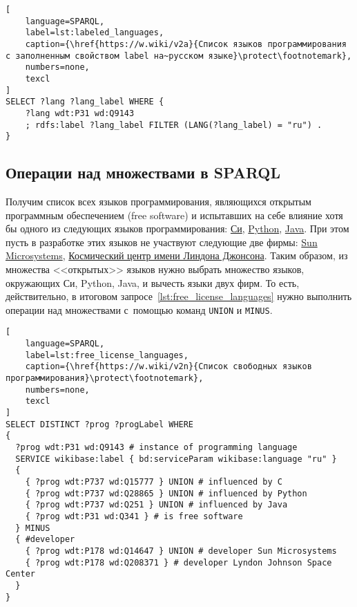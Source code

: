 \newpage
\begin{lstlisting}[
	language=SPARQL,
	label=lst:labeled_languages,
	caption={\href{https://w.wiki/v2a}{Список языков программирования с заполненным свойством label на~русском языке}\protect\footnotemark},
    numbers=none,
	texcl
]
SELECT ?lang ?lang_label WHERE {
    ?lang wdt:P31 wd:Q9143
    ; rdfs:label ?lang_label FILTER (LANG(?lang_label) = "ru") . 
}
\end{lstlisting}




\subsection{Операции над множествами в SPARQL}
Получим список всех языков программирования, 
являющихся открытым программным обеспечением (free software) 
и испытавших на себе влияние хотя бы одного из следующих языков программирования: 
\href{https://en.wikipedia.org/wiki/C_(programming_language)}{Си}, 
\href{https://ru.wikipedia.org/wiki/Python}{Python}, 
\href{https://ru.wikipedia.org/wiki/Java}{Java}. 
При этом пусть в разработке этих языков не участвуют следующие две фирмы: 
\href{https://ru.wikipedia.org/wiki/Sun_Microsystems}{Sun Microsystems}, 
\href{https://en.wikipedia.org/wiki/Johnson_Space_Center}{Космический центр имени Линдона Джонсона}. 
Таким образом, из множества <<открытых>> языков 
нужно выбрать множество языков, окружающих Си, Python, Java, 
и вычесть языки двух фирм. 
То есть, действительно, в итоговом запросе~\ref{lst:free_license_languages} 
нужно выполнить операции над множествами с~помощью команд \texttt{UNION} и \texttt{MINUS}. 


\begin{lstlisting}[
	language=SPARQL,
	label=lst:free_license_languages,
	caption={\href{https://w.wiki/v2n}{Список свободных языков программирования}\protect\footnotemark},
    numbers=none,
	texcl
]
SELECT DISTINCT ?prog ?progLabel WHERE
{
  ?prog wdt:P31 wd:Q9143 # instance of programming language
  SERVICE wikibase:label { bd:serviceParam wikibase:language "ru" } 
  {
    { ?prog wdt:P737 wd:Q15777 } UNION # influenced by C
    { ?prog wdt:P737 wd:Q28865 } UNION # influenced by Python
    { ?prog wdt:P737 wd:Q251 } UNION # influenced by Java
    { ?prog wdt:P31 wd:Q341 } # is free software
  } MINUS
  { #developer
    { ?prog wdt:P178 wd:Q14647 } UNION # developer Sun Microsystems
    { ?prog wdt:P178 wd:Q208371 } # developer Lyndon Johnson Space Center
  }
}
\end{lstlisting}



